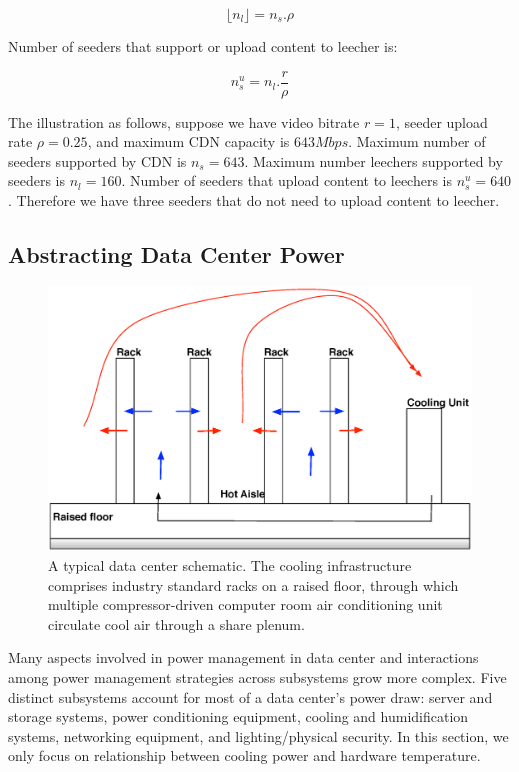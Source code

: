 \documentclass[JIP]{ipsj}
\begin{document}
\begin{equation}\label{eqn:leecher}
	\lfloor n_l \rfloor = n_s . \rho
\end{equation}

Number of seeders that support or upload content to leecher is:

\begin{equation}\label{eqn:seeders-to-leechers}
	n_{s}^{u} = n_l . \frac{r}{\rho}
\end{equation}

The illustration as follows, suppose we have video bitrate $r=1$, seeder upload rate $\rho=0.25$, and maximum CDN capacity is $643Mbps$. 
Maximum number of seeders supported by CDN is $n_s=643$.
Maximum number leechers supported by seeders is $n_l=160$.  
Number of seeders that upload content to leechers is $n_{s}^{u}=640$.  
Therefore we have three seeders that do not need to upload content to leecher. 


\subsection{Abstracting Data Center Power}\label{thermodynamics}
\begin{figure}[thb]
\begin{center}
\includegraphics[scale=0.4]{graphs/datacenter.eps}
\end{center}
\caption{A typical data center schematic.
The cooling infrastructure comprises industry standard racks on a raised floor, through which multiple compressor-driven computer room air conditioning unit circulate cool air through a share plenum.}
\label{fig:datacenter}
\vspace{-2mm}
\end{figure} 
Many aspects involved in power management in data center and interactions among power management strategies across subsystems grow more complex.
Five distinct subsystems account for most of a data center's power draw:   server and storage systems, power conditioning equipment, cooling and humidification systems, networking equipment, and lighting/physical security.
In this section, we only focus on relationship between cooling power and hardware temperature.
\end{document}
